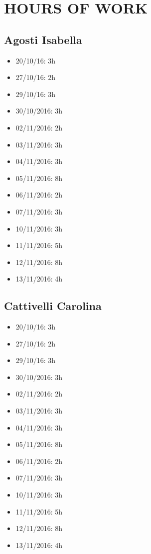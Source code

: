 \section{HOURS OF WORK}
\subsection{Agosti Isabella}
\begin{itemize}
	\item 20/10/16: 3h
	\item 27/10/16: 2h 
	\item 29/10/16: 3h
	\item 30/10/2016: 3h
	\item 02/11/2016: 2h
	\item 03/11/2016: 3h
	\item 04/11/2016: 3h
	\item 05/11/2016: 8h
	\item 06/11/2016: 2h
	\item 07/11/2016: 3h
	\item 10/11/2016: 3h
	\item 11/11/2016: 5h
	\item 12/11/2016: 8h
	\item 13/11/2016: 4h
\end{itemize}
\newpage
\subsection{Cattivelli Carolina}
\begin{itemize}
	\item 20/10/16: 3h
	\item 27/10/16: 2h
	\item 29/10/16: 3h
	\item 30/10/2016: 3h
	\item 02/11/2016: 2h
	\item 03/11/2016: 3h
	\item 04/11/2016: 3h
	\item 05/11/2016: 8h
	\item 06/11/2016: 2h
	\item 07/11/2016: 3h
	\item 10/11/2016: 3h
	\item 11/11/2016: 5h
	\item 12/11/2016: 8h
	\item 13/11/2016: 4h
\end{itemize}